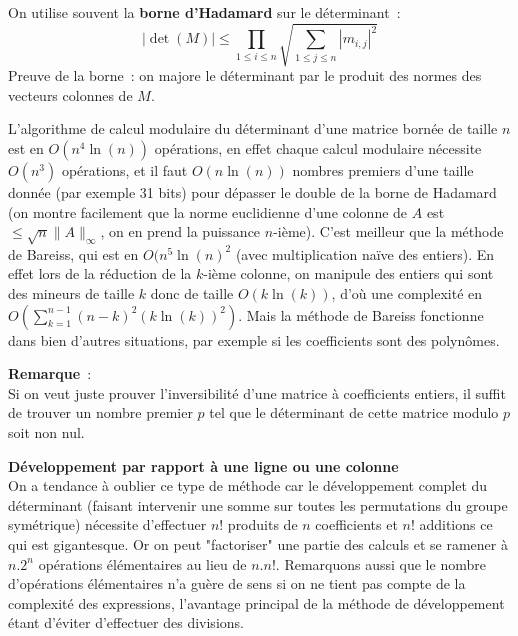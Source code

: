 \documentclass[a4paper,11pt]{book}
\begin{document}
\begin{giacjshere}
On utilise souvent la {\bf borne d'Hadamard} 
sur le d\'eterminant~:
\[ |\det(M)| \leq \prod_{1\leq i \leq n} 
\sqrt{\sum_{1\leq j \leq n} |m_{i,j}|^2}\]
Preuve de la borne~: on majore le déterminant par le produit des
normes des vecteurs colonnes de $M$.

L'algorithme de calcul modulaire du déterminant d'une matrice bornée
de taille $n$ est en $O(n^4 \ln(n))$ opérations, en effet 
chaque calcul modulaire
nécessite $O(n^3)$ opérations, et il faut $O(n\ln(n))$ nombres premiers
d'une taille donnée (par exemple 31 bits)
pour dépasser le double de la borne de Hadamard 
(on montre facilement que la norme
euclidienne d'une colonne de $A$ est $\leq \sqrt{n}\|A\|_\infty$,
on en prend la puissance $n$-ième).
C'est meilleur que la méthode de Bareiss, qui est en 
$O(n^5 \ln(n)^2$ (avec multiplication naïve des entiers). En effet
lors de la réduction de la $k$-ième colonne, on manipule des entiers
qui sont des mineurs de taille $k$ donc de taille $O(k\ln(k))$, d'où
une complexité en $O(\sum_{k=1}^{n-1} (n-k)^2 (k\ln(k))^2 )$. Mais
la méthode de Bareiss fonctionne dans bien d'autres situations, par
exemple si les coefficients sont des polynômes.

{\bf Remarque}~:\\
Si on veut juste prouver l'inversibilité d'une matrice \`a coefficients
entiers, il suffit
de trouver un nombre premier $p$ tel que le déterminant de cette matrice modulo
$p$ soit non nul.

{\bf Développement par rapport à une ligne ou une colonne}\\
On a tendance à oublier ce type de méthode car le développement
complet du déterminant (faisant intervenir une somme sur toutes les
permutations du groupe symétrique)
nécessite d'effectuer $n!$ produits
de $n$ coefficients et $n!$ additions ce qui est gigantesque. Or on peut
"factoriser" une partie des calculs et se ramener à $n.2^n$ opérations
élémentaires au lieu de $n.n!$. Remarquons aussi que le nombre
d'opérations élémentaires n'a guère de sens si on ne tient pas
compte de la complexité des expressions, l'avantage principal
de la méthode de développement étant d'éviter d'effectuer
des divisions.


\end{giacjshere}
\end{document}
